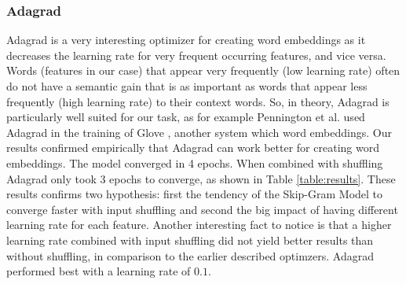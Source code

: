 \subsubsection{Adagrad}\label{ssec:results_adagrad}
Adagrad \citep{adagrad} is a very interesting optimizer for creating word embeddings as it decreases the learning rate for very frequent occurring features, and vice versa. Words (features in our case) that appear very frequently (low learning rate) often do not have a semantic gain  that is as important as words that appear less frequently (high learning rate) to their context words. So, in theory, Adagrad is particularly well suited for our task, as for example Pennington et al. used Adagrad in the training of Glove \citep{glove}, another system which word embeddings. Our results confirmed empirically that Adagrad can work better for creating word embeddings. The  model converged in 4 epochs. When combined with shuffling Adagrad only took 3 epochs to converge, as shown in Table \ref{table:results}. These results confirms two hypothesis: first  the tendency of the Skip-Gram Model to converge faster with input shuffling and second  the big impact of having different learning rate for each feature.
Another interesting fact to notice is that a higher learning rate combined with input shuffling did not yield better results than without shuffling, in comparison to the earlier described optimzers. Adagrad performed best with a learning rate of $0.1$.

